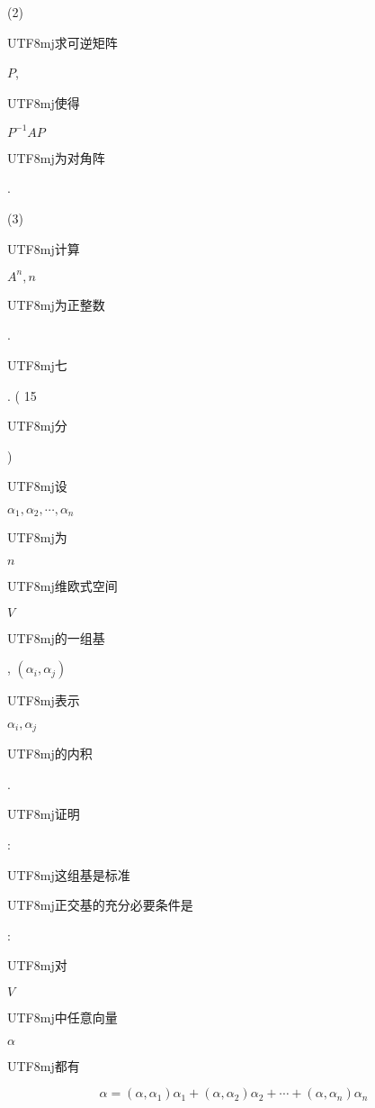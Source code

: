 \documentclass[10pt]{article}
\begin{document}
(2) \begin{CJK}{UTF8}{mj}求可逆矩阵\end{CJK} $P$, \begin{CJK}{UTF8}{mj}使得\end{CJK} $P^{-1} A P$ \begin{CJK}{UTF8}{mj}为对角阵\end{CJK}.

(3) \begin{CJK}{UTF8}{mj}计算\end{CJK} $A^{n}, n$ \begin{CJK}{UTF8}{mj}为正整数\end{CJK}. \begin{CJK}{UTF8}{mj}七\end{CJK}. ( 15 \begin{CJK}{UTF8}{mj}分\end{CJK}) \begin{CJK}{UTF8}{mj}设\end{CJK} $\alpha_{1}, \alpha_{2}, \cdots, \alpha_{n}$ \begin{CJK}{UTF8}{mj}为\end{CJK} $n$ \begin{CJK}{UTF8}{mj}维欧式空间\end{CJK} $V$ \begin{CJK}{UTF8}{mj}的一组基\end{CJK}, $\left(\alpha_{i}, \alpha_{j}\right)$ \begin{CJK}{UTF8}{mj}表示\end{CJK} $\alpha_{i}, \alpha_{j}$ \begin{CJK}{UTF8}{mj}的内积\end{CJK}. \begin{CJK}{UTF8}{mj}证明\end{CJK}: \begin{CJK}{UTF8}{mj}这组基是标准\end{CJK} \begin{CJK}{UTF8}{mj}正交基的充分必要条件是\end{CJK}: \begin{CJK}{UTF8}{mj}对\end{CJK} $V$ \begin{CJK}{UTF8}{mj}中任意向量\end{CJK} $\alpha$ \begin{CJK}{UTF8}{mj}都有\end{CJK}
$$
\alpha=\left(\alpha, \alpha_{1}\right) \alpha_{1}+\left(\alpha, \alpha_{2}\right) \alpha_{2}+\cdots+\left(\alpha, \alpha_{n}\right) \alpha_{n}
$$
\end{document}
